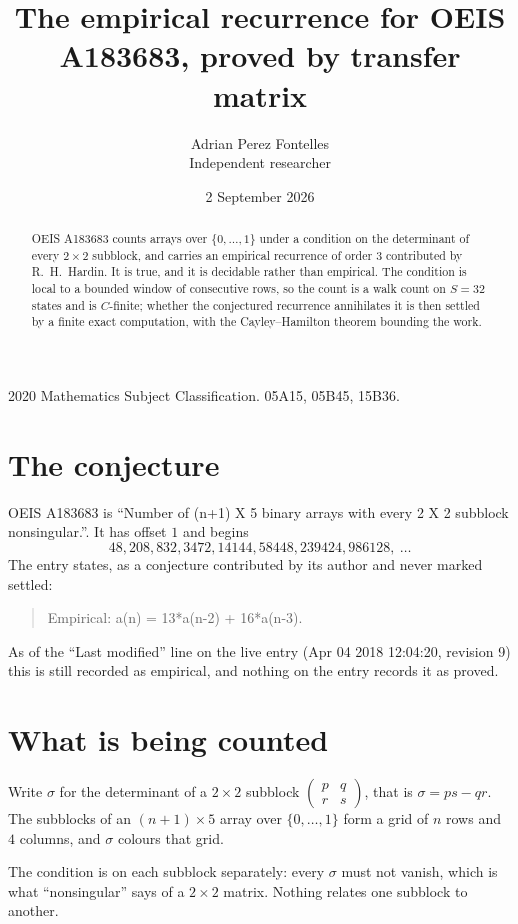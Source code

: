 \documentclass[11pt,a4paper]{article}
\title{The empirical recurrence for OEIS A183683, proved by transfer matrix}
\author{Adrian Perez Fontelles\\ \small Independent researcher}
\date{2 September 2026}
\theoremstyle{plain}
\theoremstyle{definition}
\begin{document}
\maketitle

\begin{abstract}
OEIS A183683 counts arrays over $\{0,\dots,1\}$ under a condition on the determinant of every
$2\times2$ subblock, and carries an empirical recurrence of order $3$ contributed by
R.~H.~Hardin. It is true, and it is decidable rather than empirical. The condition is local to
a bounded window of consecutive rows, so the count is a walk count on $S=32$ states and is
$C$-finite; whether the conjectured recurrence annihilates it is then settled by a finite exact
computation, with the Cayley--Hamilton theorem bounding the work.
\end{abstract}

\noindent\small 2020 Mathematics Subject Classification. 05A15, 05B45, 15B36.\normalsize

\section{The conjecture}

OEIS A183683 is ``Number of (n+1) X 5 binary arrays with every 2 X 2 subblock nonsingular.''. It has offset $1$ and begins
\[
48, 208, 832, 3472, 14144, 58448, 239424, 986128,\ \dots
\]
The entry states, as a conjecture contributed by its author and never marked settled:
\begin{quote}
Empirical: a(n) = 13*a(n-2) + 16*a(n-3).
\end{quote}
As of the ``Last modified'' line on the live entry (Apr 04 2018 12:04:20, revision 9) this is still
recorded as empirical, and nothing on the entry records it as proved.

\section{What is being counted}

Write $\sigma$ for the determinant of a $2\times2$ subblock
$\begin{pmatrix}p&q\\r&s\end{pmatrix}$, that is $\sigma=ps-qr$. The subblocks of an
$(n+1)\times5$ array over $\{0,\dots,1\}$ form a grid of $n$ rows and $4$
columns, and $\sigma$ colours that grid.

The condition is on each subblock separately: every $\sigma$ must not vanish, which is what
``nonsingular'' says of a $2\times2$ matrix. Nothing
relates one subblock to another.
\end{document}
